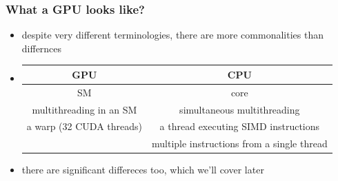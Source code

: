 \documentclass[12pt,dvipdfmx]{beamer}
\begin{document}
\begin{frame}
\frametitle{What a GPU looks like?}
\begin{itemize}
\item despite very different terminologies,
  there are more commonalities than differnces

\item []
  
  {\footnotesize
  \begin{tabular}{|c|c|}\hline
    GPU & CPU \\\hline
    SM & core \\
    multithreading in an SM & simultaneous multithreading \\
    a warp (32 CUDA threads) & a thread executing SIMD instructions \\
                & multiple instructions from a single thread \\\hline
  \end{tabular}}

\item there are significant differeces too, which we'll cover later
\end{itemize}

\end{frame}
\end{document}
